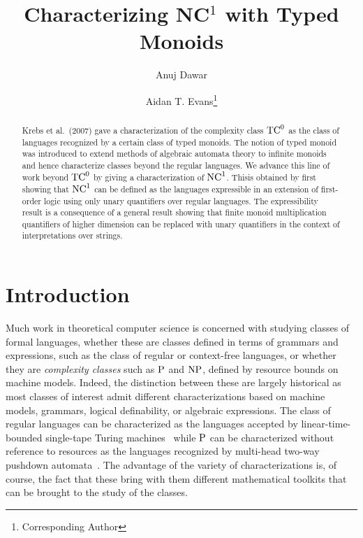 \documentclass[a4paper,UKenglish,cleveref, autoref, thm-restate, anonymous]{lipics-v2021}
\title{Characterizing NC${}^1$ with Typed Monoids} %
\author{Anuj Dawar}{Department of Computer Science and Technology, University of Cambridge, United Kingdom \and \url{https://www.cl.cam.ac.uk/~ad260/} }{anuj.dawar@cl.cam.ac.uk}{https://orcid.org/0000-0003-4014-8248}{(Optional) author-specific funding acknowledgements}%
\author{Aidan T. Evans\footnote{Corresponding Author}}{Department of Computer Science and Technology, University of Cambridge, United Kingdom \and \url{https://www.aidantevans.com/} }{ate26@cam.ac.uk}{https://orcid.org/0009-0007-9084-3608}{[funding]}
\begin{document}


\maketitle

\begin{abstract}
Krebs et al.~(2007) gave a characterization of the complexity class $\mathrm{TC}^0$ as the class of languages recognized by a certain class of typed monoids.  The notion of typed monoid was introduced to extend methods of algebraic automata theory to infinite monoids and hence characterize classes beyond the regular languages.  We advance this line of work beyond $\mathrm{TC}^0$ by giving a characterization of $\mathrm{NC}^1$.  Thisis obtained by first showing that $\mathrm{NC}^1$ can be defined as the languages expressible in an extension of first-order logic using only unary quantifiers over regular languages.  The expressibility result is a consequence of a general result showing that finite monoid multiplication quantifiers of higher dimension can be replaced with unary quantifiers in the context of interpretations over strings.
\end{abstract}

\newpage

\section{Introduction}


Much work in theoretical computer science is concerned with studying classes of formal languages, whether these are classes defined in terms of grammars and expressions, such as the class of regular or context-free languages, or whether they are \emph{complexity classes} such as $\mathrm{P}$ and $\mathrm{NP}$, defined by resource bounds on machine models.  Indeed, the distinction between these are largely historical as most classes of interest admit different characterizations based on machine models, grammars, logical definability, or algebraic expressions. The class of regular languages can be characterized as the languages accepted by linear-time-bounded single-tape Turing machines~\cite{hennie1965one} while $\mathrm{P}$ can be characterized without reference to resources as the languages recognized by multi-head two-way pushdown automata~\cite{cook1971characterizations}.  The advantage of the variety of characterizations is, of course, the fact that these bring with them different mathematical toolkits that can be brought to the study of the classes.
\end{document}
